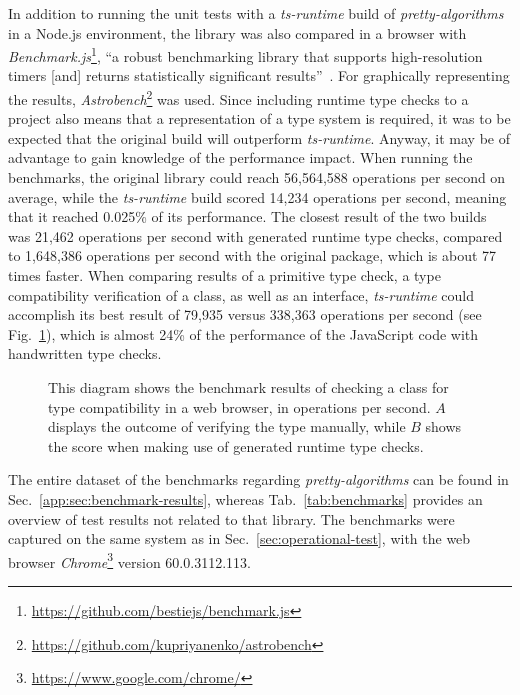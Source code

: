 In addition to running the unit tests with a \emph{ts-runtime} build of \emph{pretty-algorithms} in a Node.js environment, the library was also compared in a browser with \emph{Benchmark.js}\footnote{\url{https://github.com/bestiejs/benchmark.js}}, ``a robust benchmarking library that supports high-resolution timers [and] returns statistically significant results''~\cite{Evaluation:benchmarkjs}. For graphically representing the results, \emph{Astrobench}\footnote{\url{https://github.com/kupriyanenko/astrobench}} was used. Since including runtime type checks to a project also means that a representation of a type system is required, it was to be expected that the original build will outperform \emph{ts-runtime}. Anyway, it may be of advantage to gain knowledge of the performance impact. When running the benchmarks, the original library could reach 56,564,588 operations per second on average, while the \emph{ts-runtime} build scored 14,234 operations per second, meaning that it reached 0.025\% of its performance. The closest result of the two builds was 21,462 operations per second with generated runtime type checks, compared to 1,648,386 operations per second with the original package, which is about 77 times faster. When comparing results of a primitive type check, a type compatibility verification of a class, as well as an interface, \emph{ts-runtime} could accomplish its best result of 79,935 versus 338,363 operations per second (see Fig.~\ref{fig:benchmark}), which is almost 24\% of the performance of the JavaScript code with handwritten type checks.
\begin{figure}
\centering

\caption{This diagram shows the benchmark results of checking a class for type compatibility in a web browser, in operations per second. $A$ displays the outcome of verifying the type manually, while $B$ shows the score when making use of generated runtime type checks.}
\label{fig:benchmark}
\end{figure}
The entire dataset of the benchmarks regarding \emph{pretty-algorithms} can be found in Sec.~\ref{app:sec:benchmark-results}, whereas Tab.~\ref{tab:benchmarks} provides an overview of test results not related to that library. The benchmarks were captured on the same system as in Sec.~\ref{sec:operational-test}, with the web browser \emph{Chrome}\footnote{\url{https://www.google.com/chrome/}} version 60.0.3112.113.
